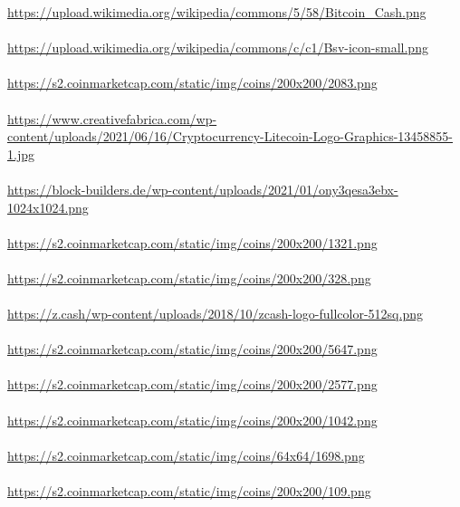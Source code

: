 \documentclass[ngerman]{scrreprt}
\begin{document}
\url{https://upload.wikimedia.org/wikipedia/commons/5/58/Bitcoin_Cash.png} \\ \\
\url{https://upload.wikimedia.org/wikipedia/commons/c/c1/Bsv-icon-small.png} \\ \\
\url{https://s2.coinmarketcap.com/static/img/coins/200x200/2083.png} \\ \\ 
\url{https://www.creativefabrica.com/wp-content/uploads/2021/06/16/Cryptocurrency-Litecoin-Logo-Graphics-13458855-1.jpg} \\ \\
\url{https://block-builders.de/wp-content/uploads/2021/01/ony3qesa3ebx-1024x1024.png} \\ \\
\url{https://s2.coinmarketcap.com/static/img/coins/200x200/1321.png} \\ \\
\url{https://s2.coinmarketcap.com/static/img/coins/200x200/328.png}\\ \\ 
\url{https://z.cash/wp-content/uploads/2018/10/zcash-logo-fullcolor-512sq.png}\\ \\
\url{https://s2.coinmarketcap.com/static/img/coins/200x200/5647.png} \\ \\
\url{https://s2.coinmarketcap.com/static/img/coins/200x200/2577.png} \\ \\
\url{https://s2.coinmarketcap.com/static/img/coins/200x200/1042.png} \\ \\
\url{https://s2.coinmarketcap.com/static/img/coins/64x64/1698.png} \\ \\
\url{https://s2.coinmarketcap.com/static/img/coins/200x200/109.png} \\ \\
\end{document}
